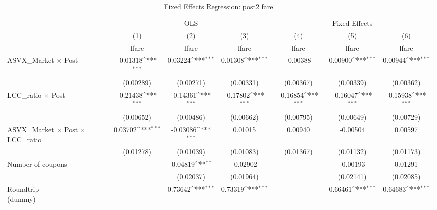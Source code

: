 \begin{table}[htbp]\centering
\def\sym#1{\ifmmode^{#1}\else\(^{#1}\)\fi}
\caption{Fixed Effects Regression: post2 fare}
\begin{tabular}{l*{6}{c}}
\toprule
                    &\multicolumn{3}{c}{OLS}                                          &\multicolumn{3}{c}{Fixed Effects}                                \\\cmidrule(lr){2-4}\cmidrule(lr){5-7}
                    &\multicolumn{1}{c}{(1)}&\multicolumn{1}{c}{(2)}&\multicolumn{1}{c}{(3)}&\multicolumn{1}{c}{(4)}&\multicolumn{1}{c}{(5)}&\multicolumn{1}{c}{(6)}\\
                    &\multicolumn{1}{c}{lfare}&\multicolumn{1}{c}{lfare}&\multicolumn{1}{c}{lfare}&\multicolumn{1}{c}{lfare}&\multicolumn{1}{c}{lfare}&\multicolumn{1}{c}{lfare}\\
\midrule
ASVX\_Market $\times$ Post&    -0.01318\sym{***}&     0.03224\sym{***}&     0.01308\sym{***}&    -0.00388         &     0.00900\sym{***}&     0.00944\sym{***}\\
                    &   (0.00289)         &   (0.00271)         &   (0.00331)         &   (0.00367)         &   (0.00339)         &   (0.00362)         \\
\addlinespace
LCC\_ratio $\times$ Post&    -0.21438\sym{***}&    -0.14361\sym{***}&    -0.17802\sym{***}&    -0.16854\sym{***}&    -0.16047\sym{***}&    -0.15938\sym{***}\\
                    &   (0.00652)         &   (0.00486)         &   (0.00662)         &   (0.00795)         &   (0.00649)         &   (0.00729)         \\
\addlinespace
ASVX\_Market $\times$ Post $\times$ LCC\_ratio&     0.03702\sym{***}&    -0.03086\sym{***}&     0.01015         &     0.00940         &    -0.00504         &     0.00597         \\
                    &   (0.01278)         &   (0.01039)         &   (0.01083)         &   (0.01367)         &   (0.01132)         &   (0.01173)         \\
\addlinespace
Number of coupons   &                     &    -0.04819\sym{**} &    -0.02902         &                     &    -0.00193         &     0.01291         \\
                    &                     &   (0.02037)         &   (0.01964)         &                     &   (0.02141)         &   (0.02085)         \\
\addlinespace
\shortstack{Roundtrip \\ (dummy)}&                     &     0.73642\sym{***}&     0.73319\sym{***}&                     &     0.66461\sym{***}&     0.64683\sym{***}\\

\end{tabular}
\end{table}
